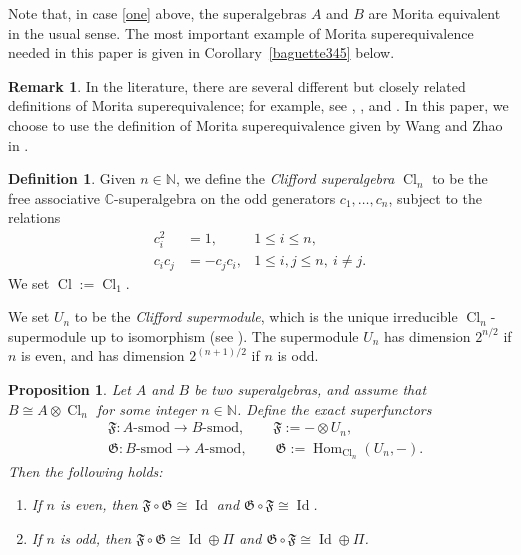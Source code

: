 \documentclass[11pt]{amsart}
\newtheorem{prop}[theo]{Proposition}
\theoremstyle{definition}
\newtheorem{defn}[theo]{Definition}
\newtheorem{rmk}[theo]{Remark}
\numberwithin{equation}{section}
\begin{document}
Note that, in case \ref{one} above, the superalgebras \(A\) and \(B\) are Morita equivalent in the usual sense. The most important example of Morita superequivalence needed in this paper is given in Corollary~\ref{baguette345} below.


\begin{rmk}
In the literature, there are several different but closely related definitions of Morita superequivalence; for example, see \cite[§2.4]{Kang-Kashiwara-Tsuchioka}, \cite[§2.2]{Kleshchev-Livesey}, and \cite[§3.1]{Wang2}. In this paper, we choose to use the definition of Morita superequivalence given by Wang and Zhao in \cite[§7.2]{Wang-Zhao}.
\end{rmk}



\begin{defn}
Given $ n \in \mathbb{N} $, we define the \emph{Clifford superalgebra} $ \operatorname{Cl}_{n} $ to be the free associative $ \mathbb{C} $-superalgebra on the odd generators $ c_{1},\ldots, c_{n} $, subject to the relations
\begin{align}
c_{i}^{2} &= 1, & 1 \leq i \leq n, \label{Clifford1}
\\ c_{i}c_{j} &= -c_{j}c_{i}, & 1 \leq i,j \leq n, \ i \neq j. \label{Clifford2}
\end{align}
We set $ \operatorname{Cl} := \operatorname{Cl}_{1} $.
\end{defn}

We set $ U_{n} $ to be the \emph{Clifford supermodule}, which is the unique irreducible $ \operatorname{Cl}_{n} $-supermodule up to isomorphism (see \cite[2.10]{Brundan-Kleshchev}). The supermodule $ U_{n} $ has dimension $ 2^{n/2} $ if \(n\) is even, and has dimension $ 2^{(n+1)/2} $ if \(n\) is odd. 


\begin{prop} \label{baguette}
Let \(A\) and \(B\) be two superalgebras, and assume that $ B \cong A \otimes \operatorname{Cl}_{n} $ for some integer $ n \in \mathbb{N} $. Define the exact superfunctors
\begin{align*}
&\mathfrak{F} \colon A\text{-smod} \rightarrow B\text{-smod}, \qquad \mathfrak{F} := - \otimes U_{n},
\\ &\mathfrak{G} \colon B\text{-smod} \rightarrow A\text{-smod}, \qquad \mathfrak{G} := \operatorname{Hom}_{\operatorname{Cl}_{n}}(U_{n}, -).
\end{align*}
Then the following holds:
\begin{enumerate}[label=\roman*)]
\item If $ n $ is even, then $ \mathfrak{F} \circ \mathfrak{G} \cong \operatorname{Id} $ and $ \mathfrak{G} \circ \mathfrak{F} \cong \operatorname{Id} $.
\item If $ n  $ is odd, then $ \mathfrak{F} \circ \mathfrak{G} \cong \operatorname{Id} \oplus \Pi $ and $ \mathfrak{G} \circ \mathfrak{F} \cong \operatorname{Id} \oplus \Pi $.
\end{enumerate}
\end{prop}
\end{document}
